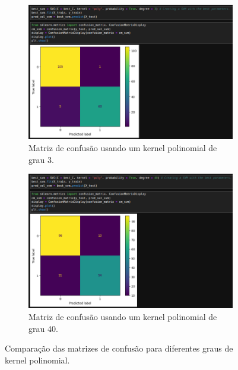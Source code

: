 \documentclass{article} %
\begin{document}
   \vspace{1cm}
   \begin{figure}[htbp] %
      \centering %
  
      \begin{subfigure}{0.75\textwidth} %
          \centering
          \includegraphics[width=\linewidth]{grau3.png} %
          \caption{Matriz de confusão usando um kernel polinomial de grau 3.} %
          \label{fig:exemplo2} %
      \end{subfigure}
      
      \vspace{0.5cm} %
  
      \begin{subfigure}{0.75\textwidth} %
          \centering
          \includegraphics[width=\linewidth]{grau40.png} %
          \caption{Matriz de confusão usando um kernel polinomial de grau 40.} %
          \label{fig:exemplo3} %
      \end{subfigure}
  
      \caption{Comparação das matrizes de confusão para diferentes graus de kernel polinomial.} %
      \label{fig:matrizes_confusao} %
  \end{figure}
\end{document}
